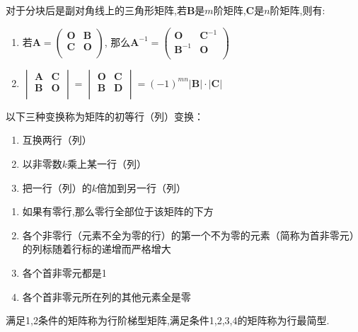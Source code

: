 对于分块后是副对角线上的三角形矩阵,若$\mathbf{B}$是$m$阶矩阵,$\mathbf{C}$是$n$阶矩阵,则有:
\begin{enumerate}
    \item 若$\mathbf{A}=\begin{pmatrix}
        \mathbf{O}   &   \mathbf{B}   \\
        \mathbf{C}   &   \mathbf{O}   \\
        \end{pmatrix}$,
    那么$\mathbf{A}^{-1}=\begin{pmatrix}
        \mathbf{O}   &   \mathbf{C}^{-1}   \\
        \mathbf{B}^{-1}   &   \mathbf{O}   \\
        \end{pmatrix}$
    \item $\begin{vmatrix}
        \mathbf{A}   &   \mathbf{C}   \\
        \mathbf{B}   &   \mathbf{O}   \\
    \end{vmatrix}
    =
    \begin{vmatrix}
        \mathbf{O}   &   \mathbf{C}   \\
        \mathbf{B}   &   \mathbf{D}   \\
    \end{vmatrix}
    =
    (-1)^{mn}\left\lvert \mathbf{B} \right\rvert \cdot \left\lvert \mathbf{C} \right\rvert $
\end{enumerate}

\begin{definition}[矩阵的初等变换]

    以下三种变换称为矩阵的初等行（列）变换：
    \begin{enumerate}
        \item 互换两行（列）
        \item 以非零数$k$乘上某一行（列）
        \item 把一行（列）的$k$倍加到另一行（列）
    \end{enumerate}
\end{definition}

\begin{definition}[行阶梯矩阵和行最简型]
    \begin{enumerate}
        \item 如果有零行,那么零行全部位于该矩阵的下方
        \item 各个非零行（元素不全为零的行）的第一个不为零的元素（简称为首非零元）的列标随着行标的递增而严格增大
        \item 各个首非零元都是1
        \item 各个首非零元所在列的其他元素全是零
    \end{enumerate}
    满足1,2条件的矩阵称为行阶梯型矩阵,满足条件1,2,3,4的矩阵称为行最简型.
\end{definition}

